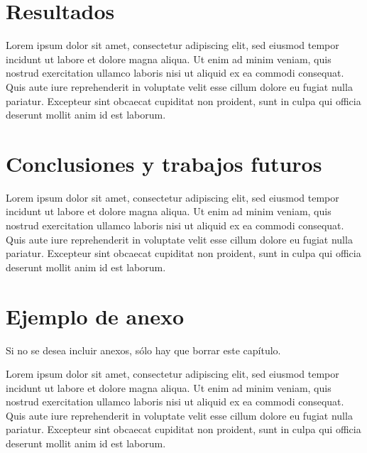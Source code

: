 \documentclass[12pt,a4paper,twoside]{book}
\begin{document}
\chapter{Resultados}
Lorem ipsum dolor sit amet, consectetur adipiscing elit, sed eiusmod tempor incidunt ut labore et dolore magna aliqua. Ut enim ad minim veniam, quis nostrud exercitation ullamco laboris nisi ut aliquid ex ea commodi consequat. Quis aute iure reprehenderit in voluptate velit esse cillum dolore eu fugiat nulla pariatur. Excepteur sint obcaecat cupiditat non proident, sunt in culpa qui officia deserunt mollit anim id est laborum.

\chapter{Conclusiones y trabajos futuros}
Lorem ipsum dolor sit amet, consectetur adipiscing elit, sed eiusmod tempor incidunt ut labore et dolore magna aliqua. Ut enim ad minim veniam, quis nostrud exercitation ullamco laboris nisi ut aliquid ex ea commodi consequat. Quis aute iure reprehenderit in voluptate velit esse cillum dolore eu fugiat nulla pariatur. Excepteur sint obcaecat cupiditat non proident, sunt in culpa qui officia deserunt mollit anim id est laborum.

\appendix
\clearpage
\appendixpage
\addappheadtotoc

\chapter{Ejemplo de anexo}
Si no se desea incluir anexos, sólo hay que borrar este capítulo.
\par
Lorem ipsum dolor sit amet, consectetur adipiscing elit, sed eiusmod tempor
incidunt ut labore et dolore magna aliqua. Ut enim ad minim veniam, quis
nostrud exercitation ullamco laboris nisi ut aliquid ex ea commodi consequat.
Quis aute iure reprehenderit in voluptate velit esse cillum dolore eu fugiat
nulla pariatur. Excepteur sint obcaecat cupiditat non proident, sunt in culpa
qui officia deserunt mollit anim id est laborum.\\

\pagebreak
\thispagestyle{empty}
\pagestyle{empty}


\end{document}
